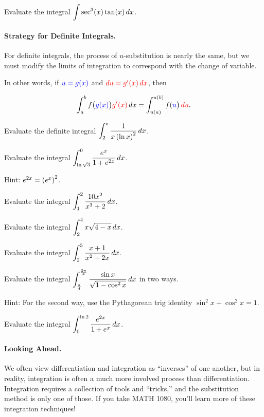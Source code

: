 \documentclass[12pt]{article}
\begin{document}
\newpage

\Example Evaluate the integral $\displaystyle\int\sec^3(x)\tan(x)\,dx$.

\vspace{55mm}

\paragraph{Strategy for Definite Integrals.} For definite integrals, the process of $u$-substitution is nearly the same, but we must modify the limits of integration to correspond with the change of variable.

\vspace{5mm}

In other words, if $\textcolor{blue}{u=g(x)}$ and $\textcolor{red}{du=g'(x)\,dx}$, then

$$\int_a^b f\big( \textcolor{blue}{g(x)}\big) \textcolor{red}{g'(x)}\,dx=\int_{u(a)}^{u(b)} f(\textcolor{blue}{u}\big)\,\textcolor{red}{du}.$$

\vspace{3mm}

\Example Evaluate the definite integral $\displaystyle\int_2^e\frac{1}{x\left(\ln x\right)^2}\,dx$.

\newpage

\Example Evaluate the integral $\displaystyle\int_{\ln\sqrt{3}}^{0}\frac{e^x}{1+e^{2x}}\,dx$.

Hint: $e^{2x}=\left( e^x\right)^2$.

\vspace{55mm}

\Example Evaluate the integral $\displaystyle\int_1^2\frac{10x^2}{x^3+2}\,dx$.

\vspace{60mm}

\Example Evaluate the integral $\displaystyle\int_2^4 x\sqrt{4-x}\,dx$.

\newpage

\Example Evaluate the integral $\displaystyle\int_2^5\frac{x+1}{x^2+2x}\,dx$.

\vspace{60mm}

\Example Evaluate the integral $\displaystyle\int_\frac{\pi}{4}^\frac{3\pi}{4}\frac{\sin x}{\sqrt{1-\cos^2x}}\,dx$ in two ways.

\vspace{2mm}

Hint: For the second way, use the Pythagorean trig identity $\sin^2 x+\cos^2 x=1$.

\newpage

\Example Evaluate the integral $\displaystyle\int_0^{\ln 2}\frac{e^{2x}}{1+e^x}\,dx$.

\vfill

\paragraph{Looking Ahead.} We often view differentiation and integration as ``inverses'' of one another, but in reality, integration is often a much more involved process than differentiation. Integration requires a collection of tools and ``tricks,'' and the substitution method is only one of those. If you take MATH 1080, you'll learn more of these integration techniques!
\end{document}
